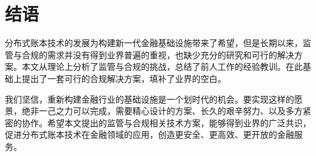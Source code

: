 \section{结语}

分布式账本技术的发展为构建新一代金融基础设施带来了希望，但是长期以来，监管与合规的需求并没有得到业界普遍的重视，也缺少充分的研究和可行的解决方案。本文从理论上分析了监管与合规的挑战，总结了前人工作的经验教训。在此基础上提出了一套可行的合规解决方案，填补了业界的空白。

我们坚信，重新构建金融行业的基础设施是一个划时代的机会。要实现这样的愿景，绝非一己之力可以完成，需要精心设计的方案、长久的艰辛努力、以及多方紧密的协作。希望本文提出的监管与合规相关技术方案，能够得到业界的广泛共识，促进分布式账本技术在金融领域的应用，创造更安全、更高效、更开放的金融服务。
